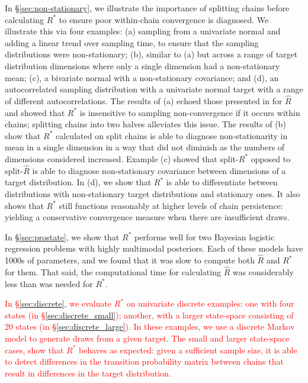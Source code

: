 \documentclass{article}
\begin{document}
In \S\ref{sec:non-stationary}, we illustrate the importance of splitting chains before calculating $R^*$ to ensure poor within-chain convergence is diagnosed. We illustrate this via four examples: (a) sampling from a univariate normal and adding a linear trend over sampling time, to ensure that the sampling distributions were non-stationary; (b), similar to (a) but across a range of target distribution dimensions where only a single dimension had a non-stationary mean; (c), a bivariate normal with a non-stationary covariance; and (d), an autocorrelated sampling distribution with a univariate normal target with a range of different autocorrelations. The results of (a) echoed those presented in \cite{vehtari2019rank} for $\widehat{R}$ and showed that $R^*$ is insensitive to sampling non-convergence if it occurs within chains; splitting chains into two halves alleviates this issue. The results of (b) show that $R^*$ calculated on split chains is able to diagnose non-stationarity in mean in a single dimension in a way that did not diminish as the numbers of dimensions considered increased. Example (c) showed that split-$R^*$ opposed to split-$\widehat{R}$ is able to diagnose non-stationary covariance between dimensions of a target distribution. In (d), we show that $R^*$ is able to differentiate between distributions with non-stationary target distributions and stationary ones. It also shows that $R^*$ still functions reasonably at higher levels of chain persistence: yielding a conservative convergence measure when there are insufficient draws.

In \S\ref{sec:prostate}, we show that $R^*$ performs well for two Bayesian logistic regression problems with highly multimodal posteriors. Each of these models have 1000s of parameters, and we found that it was slow to compute both $\widehat{R}$ and $R^*$ for them. That said, the computational time for calculating $\widehat{R}$ was considerably less than was needed for $R^*$.

\textcolor{red}{In \S\ref{sec:discrete}, we evaluate $R^*$ on univariate discrete examples: one with four states (in \S\ref{sec:discrete_small}); another, with a larger state-space consisting of 20 states (in \S\ref{sec:discrete_large}). In these examples, we use a discrete Markov model to generate draws from a given target. The small and larger state-space cases, show that $R^*$ behaves as expected: given a sufficient sample size, it is able to detect differences in the transition probability matrix between chains that result in differences in the target distribution.}
\end{document}
